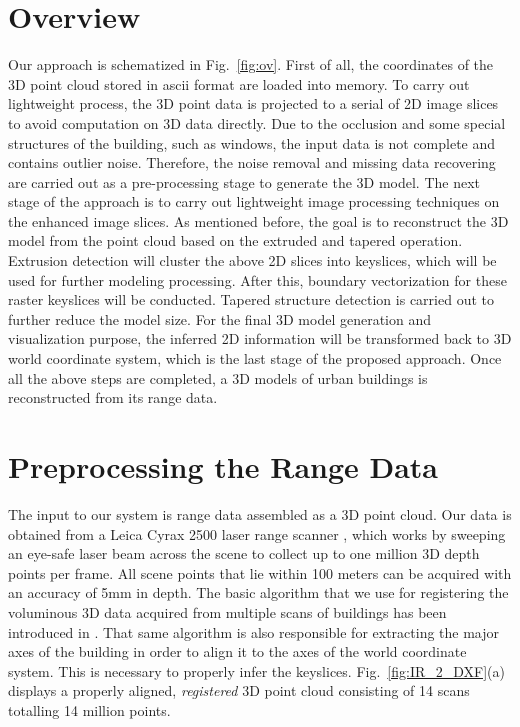 \documentclass{acmsiggraph}                     %
\newcommand{\Fig}[1]{Fig.~\ref{fig:#1}}
\newcommand{\Figa}[1]{Fig.~\ref{fig:#1}(a)}
\begin{document}
\section{Overview}
Our approach is schematized in \Fig{ov}.
First of all, the coordinates of the 3D point cloud stored in ascii format are loaded into memory.
To carry out lightweight process, the 3D point data
is projected to a serial of 2D image slices to avoid computation on 3D data directly.
Due to the occlusion and some special structures of the building, such as windows, the input data
is not complete and contains outlier noise.
Therefore, the noise removal and missing data recovering are carried out as a pre-processing stage to
generate the 3D model.
The next stage of the approach is to carry out lightweight
image processing techniques on the enhanced image slices.
As mentioned before, the goal is to reconstruct the 3D
model from the point cloud based on the extruded and tapered
operation. Extrusion detection will cluster the above 2D slices into keyslices, which will
be used for further modeling processing.
After this, boundary vectorization for these raster
keyslices will be conducted. Tapered structure detection is carried out to
further reduce the model size.
For the final 3D model generation and visualization purpose, the inferred 2D information will
be transformed back to 3D world coordinate system, which is the last stage of the proposed approach.
Once all the above steps are completed, a 3D models of urban buildings is reconstructed
from its range data.

\section{Preprocessing the Range Data}
\label{sec:prep}

The input to our system is range data assembled as a 3D point cloud.
Our data is obtained from a Leica Cyrax 2500 laser range scanner \cite{RDP_LRS},
which works by sweeping an eye-safe laser beam across the scene to collect
up to one million 3D depth points per frame.
All scene points that lie within 100 meters can be acquired with an accuracy
of 5mm in depth.
The basic algorithm that we use for registering the voluminous 3D data
acquired from multiple scans of buildings has been introduced in
\cite{RDP_LS}.
That same algorithm is also responsible for extracting the major axes
of the building in order to align it to the axes of the world coordinate
system.
This is necessary to properly infer the keyslices.
\Figa{IR_2_DXF} displays a properly aligned, {\it registered} 3D point cloud
consisting of 14 scans totalling 14 million points.
\end{document}
